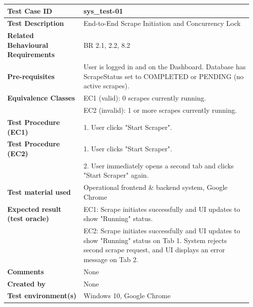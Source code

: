 
\begin{table}[h!]
\small
\renewcommand{\arraystretch}{1.1}
\begin{tabularx}{\linewidth}{>{\bfseries}l X}
\hline
Test Case ID & sys\_test-01 \\ \hline
Test Description & End-to-End Scrape Initiation and Concurrency Lock \\ \hline
Related Behavioural Requirements & BR 2.1, 2.2, 8.2 \\ \hline
Pre-requisites & User is logged in and on the Dashboard. Database has ScrapeStatus set to COMPLETED or PENDING (no active scrapes). \\ \hline
Equivalence Classes & EC1 (valid): 0 scrapes currently running.\\ & EC2 (invalid): 1 or more scrapes currently running. \\ \hline
Test Procedure (EC1) & 1. User clicks "Start Scraper".\\ \hline  
Test Procedure (EC2) & 
1. User clicks "Start Scraper".\\
& 2. User immediately opens a second tab and clicks "Start Scraper" again. \\ \hline
Test material used & Operational frontend \& backend system, Google Chrome \\ \hline
Expected result (test oracle) & EC1: Scrape initiates successfully and UI updates to show "Running" status.\\ & EC2: Scrape initiates successfully and UI updates to show "Running" status on Tab 1. System rejects second scrape request, and UI displays an error message on Tab 2. \\ \hline
Comments & None \\ \hline
Created by & None \\ \hline
Test environment(s) & Windows 10, Google Chrome \\ \hline
\end{tabularx}
\end{table}


